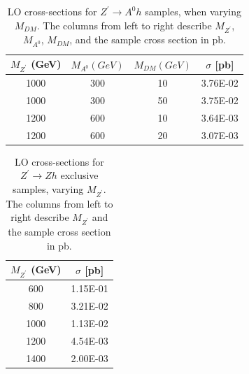 \begin{table}
	\centering
	\small
	\begin{tabular}{|c|c|c|c|}
		\hline
		$M_{Z^\prime}$ (GeV) & $M_{A^0}(GeV)$ & $M_{DM} (GeV)$ & $\sigma$ [pb] \\ \hline \hline
		1000 & 300 & 10 & 3.76E-02  \\
		1000 & 300 & 50 & 3.75E-02  \\
		1200 & 600 & 10 & 3.64E-03  \\
		1200 & 600 & 20 & 3.07E-03  \\
		\hline
		\hline
	\end{tabular}
	\caption{LO cross-sections for $Z^\prime \to A^0h$ samples, when varying $M_{DM}$. The columns from left to right describe $M_{Z^\prime}$, $M_{A^0}$, $M_{DM}$, and the sample cross section in pb.}
	\label{tab:SigSamplesZpDM}
\end{table}

\begin{table}
	\centering
	\small
	\begin{tabular}{|c|c|}
		\hline
		$M_{Z^\prime}$ (GeV) & $\sigma$ [pb] \\ \hline \hline
		600 & 1.15E-01  \\
		800 & 3.21E-02  \\
		1000 & 1.13E-02  \\
		1200 & 4.54E-03  \\
		1400 & 2.00E-03  \\
		\hline
		\hline
	\end{tabular}
	\caption{LO cross-sections for $Z^\prime \to Zh$ exclusive samples, varying $M_{Z^\prime}$. The columns from left to right describe $M_{Z^\prime}$ and the sample cross section in pb.}
	\label{tab:SigSamplesZpZh}
\end{table}